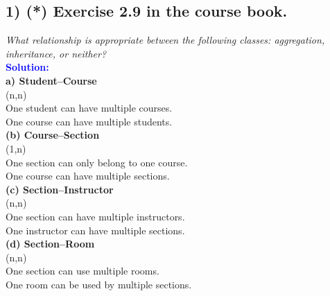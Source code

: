 \documentclass{article}
\begin{document}
\subsection*{1) (*) Exercise 2.9 in the course book.}
\hypertarget{E1}{ }
\textit{What relationship is appropriate between the following classes: aggregation,
inheritance, or neither?}\\
\indent \textbf{\textcolor{blue}{Solution:}} \\
\textbf{a) Student–Course}\\
\indent (n,n) \\
\indent    One student can have multiple courses.\\
\indent    One course can have multiple students.\\
\textbf{(b) Course–Section}\\
\indent    (1,n)\\
\indent    One section can only belong to one course.\\
\indent    One course can have multiple sections.\\
\textbf{(c) Section–Instructor}\\
\indent    (n,n)\\
\indent    One section can have multiple instructors.\\
\indent    One instructor can have multiple sections.\\
\textbf{(d) Section–Room}\\
\indent    (n,n)\\
\indent    One section can use multiple rooms.\\
\indent    One room can be used by multiple sections.\\
\end{document}
